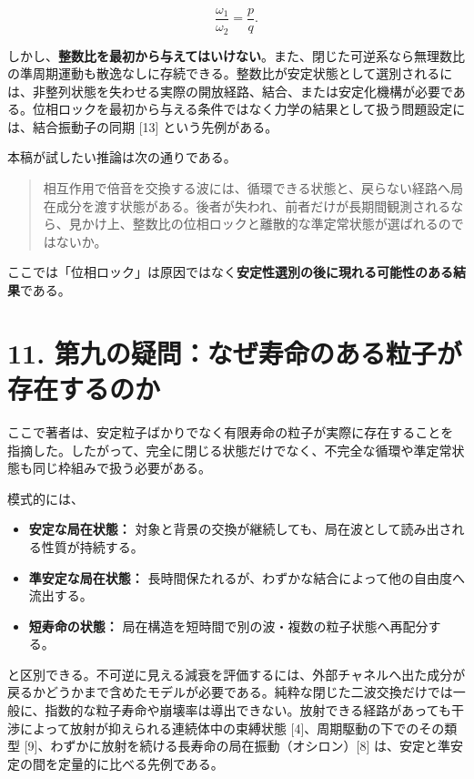 \documentclass[
  a4paper,
]{ltjsarticle}
\providecommand{\tightlist}{%
  \setlength{\itemsep}{0pt}\setlength{\parskip}{0pt}}
\begin{document}
\[
\frac{\omega_1}{\omega_2}=\frac pq.
\]

しかし、\textbf{整数比を最初から与えてはいけない}。また、閉じた可逆系なら無理数比の準周期運動も散逸なしに存続できる。整数比が安定状態として選別されるには、非整列状態を失わせる実際の開放経路、結合、または安定化機構が必要である。位相ロックを最初から与える条件ではなく力学の結果として扱う問題設定には、結合振動子の同期
{[}13{]} という先例がある。

本稿が試したい推論は次の通りである。

\begin{quote}
相互作用で倍音を交換する波には、循環できる状態と、戻らない経路へ局在成分を渡す状態がある。後者が失われ、前者だけが長期間観測されるなら、見かけ上、整数比の位相ロックと離散的な準定常状態が選ばれるのではないか。
\end{quote}

ここでは「位相ロック」は原因ではなく\textbf{安定性選別の後に現れる可能性のある結果}である。

\section{11.
第九の疑問：なぜ寿命のある粒子が存在するのか}\label{ux7b2cux4e5dux306eux7591ux554fux306aux305cux5bffux547dux306eux3042ux308bux7c92ux5b50ux304cux5b58ux5728ux3059ux308bux306eux304b}

ここで著者は、安定粒子ばかりでなく有限寿命の粒子が実際に存在することを指摘した。したがって、完全に閉じる状態だけでなく、不完全な循環や準定常状態も同じ枠組みで扱う必要がある。

模式的には、

\begin{itemize}
\tightlist
\item
  \textbf{安定な局在状態：}
  対象と背景の交換が継続しても、局在波として読み出される性質が持続する。
\item
  \textbf{準安定な局在状態：}
  長時間保たれるが、わずかな結合によって他の自由度へ流出する。
\item
  \textbf{短寿命の状態：}
  局在構造を短時間で別の波・複数の粒子状態へ再配分する。
\end{itemize}

と区別できる。不可逆に見える減衰を評価するには、外部チャネルへ出た成分が戻るかどうかまで含めたモデルが必要である。純粋な閉じた二波交換だけでは一般に、指数的な粒子寿命や崩壊率は導出できない。放射できる経路があっても干渉によって放射が抑えられる連続体中の束縛状態
{[}4{]}、周期駆動の下でのその類型
{[}9{]}、わずかに放射を続ける長寿命の局在振動（オシロン）{[}8{]}
は、安定と準安定の間を定量的に比べる先例である。
\end{document}
